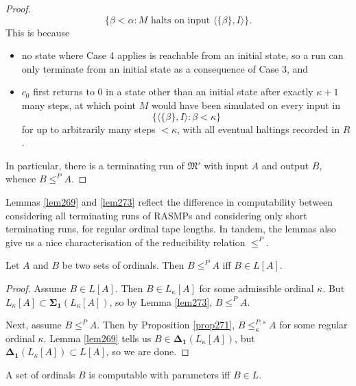 \documentclass[12pt]{article}
\numberwithin{equation}{section}
\begin{document}
\begin{proof}
\begin{equation*}
    \{\beta < \alpha : M \text{ halts on input } \langle \{\beta\}, I \rangle\} \text{.}
\end{equation*}This is because
\begin{itemize}
    \item no state where Case 4 applies is reachable from an initial state, so a run can only terminate from an initial state as a consequence of Case 3, and
    \item $c_0$ first returns to $0$ in a state other than an initial state after exactly $\kappa + 1$ many steps, at which point $M$ would have been simulated on every input in 
    \begin{equation*}
        \{\langle \{\beta\}, I \rangle : \beta < \kappa\}
    \end{equation*}
    for up to arbitrarily many steps $< \kappa$, with all eventual haltings recorded in $R$.
\end{itemize}
In particular, there is a terminating run of $\mathfrak{M}'$ with input $A$ and output $B$, whence $B \leq^P A$.
\end{proof}

Lemmas \ref{lem269} and \ref{lem273} reflect the difference in computability between considering all terminating runs of RASMPs and considering only short terminating runs, for regular ordinal tape lengths. In tandem, the lemmas also give us a nice characterisation of the reducibility relation $\leq^P$.

\begin{lem}\label{lem275}
Let $A$ and $B$ be two sets of ordinals. Then $B \leq^P A$ iff $B \in L[A]$.
\end{lem}

\begin{proof}
Assume $B \in L[A]$. Then $B \in L_{\kappa}[A]$ for some admissible ordinal $\kappa$. But $L_{\kappa}[A] \subset \mathbf{\Sigma_1}(L_{\kappa}[A])$, so by Lemma \ref{lem273}, $B \leq^P A$. 

Next, assume $B \leq^P A$. Then by Proposition \ref{prop271}, $B \leq^{P, s}_{\kappa} A$ for some regular ordinal $\kappa$. Lemma \ref{lem269} tells us $B \in \mathbf{\Delta_1}(L_{\kappa}[A])$, but $\mathbf{\Delta_1}(L_{\kappa}[A]) \subset L[A]$, so we are done.
\end{proof}

\begin{cor}
A set of ordinals $B$ is computable with parameters iff $B \in L$.
\end{cor}
\end{document}
